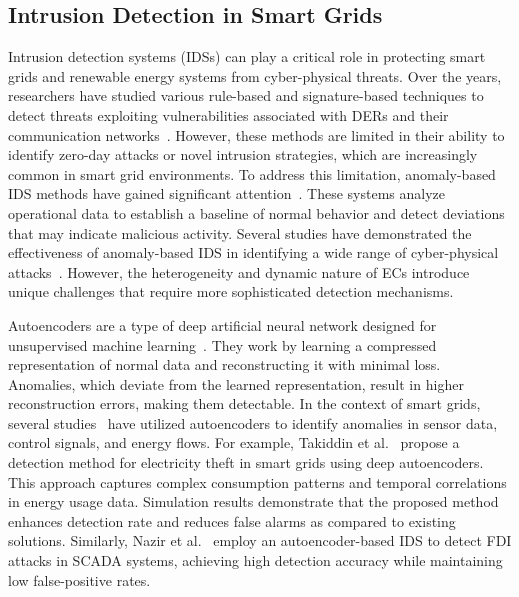 

\subsection{Intrusion Detection in Smart Grids} 
Intrusion detection systems (IDSs) can play a critical role in protecting smart grids and renewable energy systems from cyber-physical threats. Over the years, researchers have studied various rule-based and signature-based techniques to detect threats exploiting vulnerabilities associated with DERs and their communication networks~\cite{ids-compilation1, ids-compilation2, ids-rule}. However, these methods are limited in their ability to identify zero-day attacks or novel intrusion strategies, which are increasingly common in smart grid environments. To address this limitation, anomaly-based IDS methods have gained significant attention~\cite{ids-ml}. These systems analyze operational data to establish a baseline of normal behavior and detect deviations that may indicate malicious activity. Several studies have demonstrated the effectiveness of anomaly-based IDS in identifying a wide range of cyber-physical attacks~\cite{ids-ml2}. However, the heterogeneity and dynamic nature of ECs introduce unique challenges that require more sophisticated detection mechanisms.

Autoencoders are a type of deep artificial neural network designed for unsupervised machine learning~\cite{autoencoders}. They work by learning a compressed representation of normal data and reconstructing it with minimal loss. Anomalies, which deviate from the learned representation, result in higher reconstruction errors, making them detectable. In the context of smart grids, several studies~\cite{ids-auto1,ids-auto2,ids-auto3} have utilized autoencoders to identify anomalies in sensor data, control signals, and energy flows. For example, Takiddin et al.~\cite{ids-auto1} propose a detection method for electricity theft in smart grids using deep autoencoders. This approach captures complex consumption patterns and temporal correlations in energy usage data. Simulation results demonstrate that the proposed method enhances detection rate and reduces false alarms as compared to existing solutions. Similarly, Nazir et al.~\cite{ids-auto4} employ an autoencoder-based IDS to detect FDI attacks in SCADA systems, achieving high detection accuracy while maintaining low false-positive rates. 

